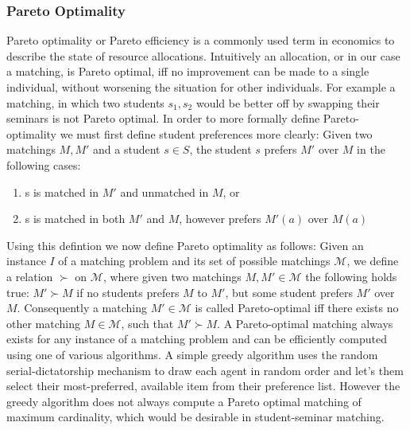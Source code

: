 \subsubsection{Pareto Optimality}
Pareto optimality or Pareto efficiency is a commonly used term in economics to describe the state of resource allocations. Intuitively an allocation, or in our case a matching, is Pareto optimal, iff no improvement can be made to a single individual, without worsening the situation for other individuals. For example a matching, in which two students $s_1, s_2$ would be better off by swapping their seminars is not Pareto optimal.
In order to more formally define Pareto-optimality we must first define student preferences more clearly: 
\newline
Given two matchings $M, M'$ and a student $s \in S$, the student $s$ prefers $M'$ over $M$ in the following cases:
\begin{enumerate}
    \item s is matched in $M'$ and unmatched in $M$, or
    \item s is matched in both $M'$ and $M$, however prefers $M'(a)$ over $M(a)$
\end{enumerate}
Using this defintion we now define Pareto optimality as follows: Given an instance $I$ of a matching problem and its set of possible matchings $\mathcal{M}$, we define a relation $\succ$ on $\mathcal{M}$, where given two matchings $M, M' \in \mathcal{M}$ the following holds true: $M' \succ M$ if no students prefers $M$ to $M'$, but some student prefers $M'$ over $M$. Consequently a matching $M' \in \mathcal{M}$ is called Pareto-optimal iff there exists no other matching $M \in \mathcal{M}$, such that $M' \succ M$.\cite{algorithmics}
A Pareto-optimal matching always exists for any instance of a matching problem and can be efficiently computed using one of various algorithms. A simple greedy algorithm uses the random serial-dictatorship mechanism to draw each agent in random order and let's them select their most-preferred, available item from their preference list.\cite{RothTwoSided, SerialDictatorship} However the greedy algorithm does not always compute a Pareto optimal matching of maximum cardinality, which would be desirable in student-seminar matching.\cite{Abraham:2005:POH:2129395.2129512}

